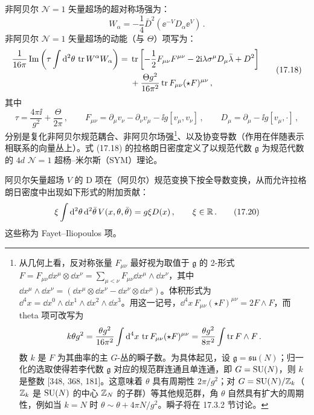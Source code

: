 \begin{definition}[17.25] 非阿贝尔 $\mathcal{N}=1$ 矢量超场的超对称场强为：
\begin{equation}
W_\alpha=-\frac{1}{4}\bar D^2\left(\ee^{-V}D_\alpha\ee^{V}\right)\,.
\tag{17.17}
\end{equation}
非阿贝尔 $\mathcal{N}=1$ 矢量超场的动能（与 $\Theta$）项写为：
\begin{equation}
\begin{aligned}
\frac{1}{16\pi}\operatorname{Im}\left(\tau\int \mathrm{d}^2\theta\,\operatorname{tr} W^\alpha W_\alpha\right)
={}&\operatorname{tr}\left[-\frac{1}{2}F_{\mu\nu}F^{\mu\nu}-2\mathrm{i}\lambda\sigma^\mu D_\mu\bar\lambda+D^2\right]\\
&+\frac{\Theta g^2}{16\pi^2}\operatorname{tr} F_{\mu\nu}(\star F)^{\mu\nu}\,,
\end{aligned}
\tag{17.18}
\end{equation}
其中
\begin{equation}
\tau=\frac{4\pi\ii}{g^2}+\frac{\Theta}{2\pi}\,,\qquad
F_{\mu\nu}=\partial_\mu v_\nu-\partial_\nu v_\mu-\ii g[v_\mu,v_\nu]\,,\qquad
D_\mu=\partial_\mu-\ii g[v_\mu,\cdot]\,,
\tag{17.19}
\end{equation}
分别是复化非阿贝尔规范耦合、非阿贝尔场强\footnote{从几何上看，反对称张量 $F_{\mu\nu}$ 最好视为取值于 $\mathfrak{g}$ 的 2-形式 $F=F_{\mu\nu}\dd x^\mu\otimes\dd x^\nu=\sum_{\mu<\nu}F_{\mu\nu}\dd x^\mu\wedge\dd x^\nu$，其中 $\dd x^\mu\wedge\dd x^\nu=(\dd x^\mu\otimes\dd x^\nu-\dd x^\nu\otimes\dd x^\mu)$。体积形式为 $\dd^4x=\dd x^0\wedge\dd x^1\wedge\dd x^2\wedge\dd x^3$。用这一记号，$\dd^4x\,F_{\mu\nu}(\star F)^{\mu\nu}=2F\wedge F$，而 theta 项可改写为
\[
k\theta g^2=\frac{\theta g^2}{16\pi^2}\int \mathrm{d}^4x\,\operatorname{tr} F_{\mu\nu}(\star F)^{\mu\nu}=\frac{\theta g^2}{8\pi^2}\int \operatorname{tr} F\wedge F\,.
\]
数 $k$ 是 $F$ 为其曲率的主 $G$-丛的瞬子数。为具体起见，设 $\mathfrak{g}=\mathfrak{su}(N)$；归一化的选取使得若李代数 $\mathfrak{g}$ 对应的规范群连通且单连通，即 $G=\operatorname{SU}(N)$，则 $k$ 是整数 [348, 368, 181]。这意味着 $\theta$ 具有周期性 $2\pi/g^2$；对 $G=\operatorname{SU}(N)/\mathbb{Z}_k$（$\mathbb{Z}_k$ 是 $\operatorname{SU}(N)$ 的中心 $\mathbb{Z}_N$ 的子群）等其他规范群，角 $\theta$ 自然具有扩大的周期性，例如当 $k=N$ 时 $\theta\sim\theta+4\pi N/g^2$。瞬子将在 17.3.2 节讨论。}、以及协变导数（作用在伴随表示相联系的向量丛上）。式 (17.18) 的拉格朗日密度定义了以规范代数 $\mathfrak{g}$ 为规范代数的 $4d$ $\mathcal{N}=1$ 超杨–米尔斯（SYM）理论。\end{definition}

阿贝尔矢量超场 $V$ 的 D 项在（阿贝尔）规范变换下按全导数变换，从而允许拉格朗日密度中出现如下形式的附加贡献：
\begin{equation}
\xi\int \mathrm{d}^2\theta\,\mathrm{d}^2\bar\theta\,V(x,\theta,\bar\theta)=g\xi D(x)\,,\qquad \xi\in\mathbb{R}\,.
\tag{17.20}
\end{equation}
这些称为 Fayet–Iliopoulos 项。

